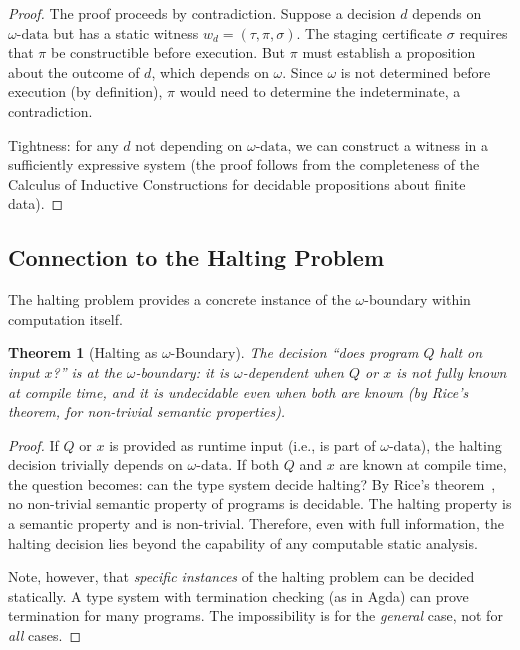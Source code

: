 \documentclass[11pt]{article}
\newtheorem{theorem}{Theorem}[section]
\newcommand{\witness}{w_d}
\newcommand{\omegadata}{\omega\text{-data}}
\begin{document}
\begin{proof}
The proof proceeds by contradiction. Suppose a decision $d$ depends on $\omegadata$
but has a static witness $\witness = (\tau, \pi, \sigma)$. The staging certificate
$\sigma$ requires that $\pi$ be constructible before execution. But $\pi$ must
establish a proposition about the outcome of $d$, which depends on $\omega$. Since
$\omega$ is not determined before execution (by definition), $\pi$ would need to
determine the indeterminate, a contradiction.

Tightness: for any $d$ not depending on $\omegadata$, we can construct a witness in a
sufficiently expressive system (the proof follows from the completeness of the Calculus
of Inductive Constructions for decidable propositions about finite data).
\end{proof}

\subsection{Connection to the Halting Problem}

The halting problem provides a concrete instance of the $\omega$-boundary within
computation itself.

\begin{theorem}[Halting as $\omega$-Boundary]
\label{thm:halting}
The decision ``does program $Q$ halt on input $x$?'' is at the $\omega$-boundary: it
is $\omega$-dependent when $Q$ or $x$ is not fully known at compile time, and it is
undecidable even when both are known (by Rice's theorem, for non-trivial semantic
properties).
\end{theorem}

\begin{proof}
If $Q$ or $x$ is provided as runtime input (i.e., is part of $\omegadata$), the
halting decision trivially depends on $\omegadata$. If both $Q$ and $x$ are known at
compile time, the question becomes: can the type system decide halting? By Rice's
theorem~\cite{rice1953classes}, no non-trivial semantic property of programs is
decidable. The halting property is a semantic property and is non-trivial. Therefore,
even with full information, the halting decision lies beyond the capability of any
computable static analysis.

Note, however, that \emph{specific instances} of the halting problem can be decided
statically. A type system with termination checking (as in Agda) can prove termination
for many programs. The impossibility is for the \emph{general} case, not for
\emph{all} cases.
\end{proof}
\end{document}
